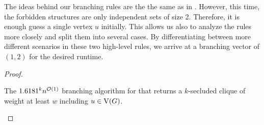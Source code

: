 \begin{lemma}
The ideas behind our branching rules are the the same as in . However, this time, the forbidden structures are only independent sets of size 2. Therefore, it is enough guess a single vertex $u$ initially. This allows us also to analyze the rules more closely and split them into several cases.
By differentiating between more different scenarios in these two high-level rules, we arrive at a branching vector of $(1,2)$ for the desired runtime.

\restateclique*

\iflong
\begin{proof}
    \begin{algorithm}[t]
      \caption{The $1.6181^kn^{\mathcal{O}(1)}$ branching algorithm for \clique{} that returns a $k$-secluded clique of weight at least $w$ including $u \in \operatorname{V}({G})$.}
      \label{alg:clique_fast}
      \DontPrintSemicolon
    \end{algorithm}


\end{proof}
\end{lemma}
